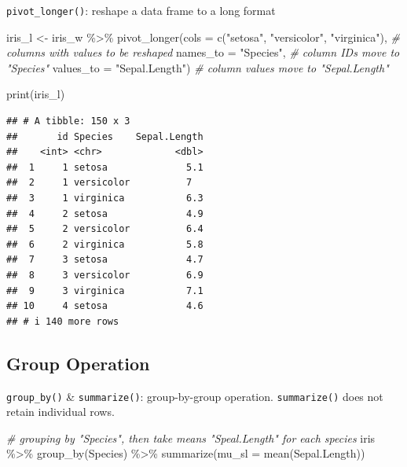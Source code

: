 \documentclass[
]{book}
\newenvironment{Shaded}{\begin{snugshade}}{\end{snugshade}}
\newcommand{\AttributeTok}[1]{\textcolor[rgb]{0.77,0.63,0.00}{#1}}
\newcommand{\CommentTok}[1]{\textcolor[rgb]{0.56,0.35,0.01}{\textit{#1}}}
\newcommand{\FunctionTok}[1]{\textcolor[rgb]{0.00,0.00,0.00}{#1}}
\newcommand{\NormalTok}[1]{#1}
\newcommand{\OtherTok}[1]{\textcolor[rgb]{0.56,0.35,0.01}{#1}}
\newcommand{\SpecialCharTok}[1]{\textcolor[rgb]{0.00,0.00,0.00}{#1}}
\newcommand{\StringTok}[1]{\textcolor[rgb]{0.31,0.60,0.02}{#1}}
\begin{document}
\texttt{pivot\_longer()}: reshape a data frame to a long format

\begin{Shaded}
\begin{Highlighting}[]
\NormalTok{iris\_l }\OtherTok{\textless{}{-}}\NormalTok{ iris\_w }\SpecialCharTok{\%\textgreater{}\%} 
  \FunctionTok{pivot\_longer}\NormalTok{(}\AttributeTok{cols =} \FunctionTok{c}\NormalTok{(}\StringTok{"setosa"}\NormalTok{,}
                        \StringTok{"versicolor"}\NormalTok{,}
                        \StringTok{"virginica"}\NormalTok{), }\CommentTok{\# columns with values to be reshaped}
               \AttributeTok{names\_to =} \StringTok{"Species"}\NormalTok{, }\CommentTok{\# column IDs move to "Species"}
               \AttributeTok{values\_to =} \StringTok{"Sepal.Length"}\NormalTok{) }\CommentTok{\# column values move to "Sepal.Length"}

\FunctionTok{print}\NormalTok{(iris\_l)}
\end{Highlighting}
\end{Shaded}

\begin{verbatim}
## # A tibble: 150 x 3
##       id Species    Sepal.Length
##    <int> <chr>             <dbl>
##  1     1 setosa              5.1
##  2     1 versicolor          7  
##  3     1 virginica           6.3
##  4     2 setosa              4.9
##  5     2 versicolor          6.4
##  6     2 virginica           5.8
##  7     3 setosa              4.7
##  8     3 versicolor          6.9
##  9     3 virginica           7.1
## 10     4 setosa              4.6
## # i 140 more rows
\end{verbatim}

\hypertarget{group-operation}{%
\subsection{Group Operation}\label{group-operation}}

\texttt{group\_by()} \& \texttt{summarize()}: group-by-group operation. \texttt{summarize()} does not retain individual rows.

\begin{Shaded}
\begin{Highlighting}[]
\CommentTok{\# grouping by "Species", then take means "Speal.Length" for each species}
\NormalTok{iris }\SpecialCharTok{\%\textgreater{}\%} 
  \FunctionTok{group\_by}\NormalTok{(Species) }\SpecialCharTok{\%\textgreater{}\%} 
  \FunctionTok{summarize}\NormalTok{(}\AttributeTok{mu\_sl =} \FunctionTok{mean}\NormalTok{(Sepal.Length))}
\end{Highlighting}
\end{Shaded}
\end{document}
